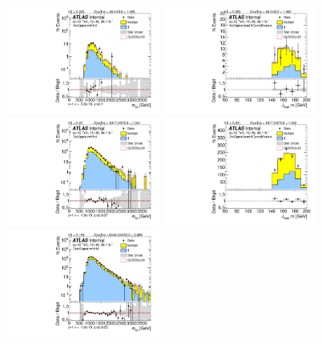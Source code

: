 \begin{figure}[htbp!]
\begin{center}
\includegraphics[angle=270, width=0.45\textwidth]{./figures/boosted/TT/Moriond_TT_FourTag_Signal_mHH_l_1.pdf}
\includegraphics[angle=270, width=0.45\textwidth]{./figures/boosted/TT/Moriond_TT_FourTag_Signal_leadHCand_Mass_s.pdf}\\
\includegraphics[angle=270, width=0.45\textwidth]{./figures/boosted/TT/Moriond_TT_ThreeTag_Signal_mHH_l_1.pdf}
\includegraphics[angle=270, width=0.45\textwidth]{./figures/boosted/TT/Moriond_TT_ThreeTag_Signal_leadHCand_Mass_s.pdf}\\
\includegraphics[angle=270, width=0.45\textwidth]{./figures/boosted/TT/Moriond_TT_TwoTag_split_Signal_mHH_l_1.pdf}

\end{center}
\end{figure}
